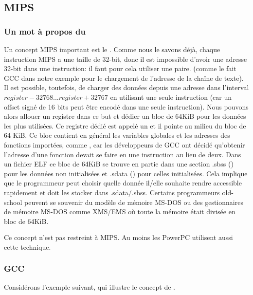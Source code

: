 \subsection{MIPS}

\subsubsection{Un mot à propos du }
\label{MIPS_GP}


Un concept MIPS important est le .
Comme nous le savons déjà, chaque instruction MIPS a une taille de 32-bit, donc
il est impossible d'avoir une adresse 32-bit dans une instruction: il faut pour
cela utiliser une paire.
(comme le fait GCC dans notre exemple pour le chargement de l'adresse de la chaîne
de texte).
Il est possible, toutefois, de charger des données depuis une adresse dans l'interval
$register-32768...register+32767$ en utilisant une seule instruction (car un offset
signé de 16 bits peut être encodé dans une seule instruction).
Nous pouvons alors allouer un registre dans ce but et dédier un bloc de 64KiB
pour les données les plus utilisées.
Ce registre dédié est appelé un  et il pointe au milieu du
bloc de 64 KiB.
Ce bloc contient en général les variables globales et les adresses des fonctions
importées, comme \printf, car les développeurs de GCC ont décidé qu'obtenir
l'adresse d'une fonction devait se faire en une instruction au lieu de deux.
Dans un fichier ELF ce bloc de 64KiB se trouve en partie dans une section .sbss
() pour les données non initialisées et .sdata ()
pour celles initialisées.
Cela implique que le programmeur peut choisir quelle donnée il/elle souhaite rendre
accessible rapidement et doit les stocker dans .sdata/.sbss.
Certains programmeurs old-school peuvent se souvenir du modèle de mémoire MS-DOS
 ou des gestionnaires de mémoire MS-DOS comme XMS/EMS
où toute la mémoire était divisée en bloc de 64KiB.


Ce concept n'est pas restreint à MIPS. Au moins les PowerPC utilisent aussi cette
technique.

\subsubsection{GCC \Optimizing}

Considérons l'exemple suivant, qui illustre le concept de .

